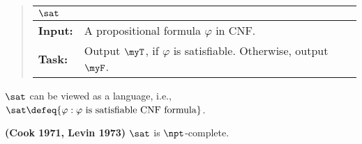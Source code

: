 \documentclass[11pt, a4paper]{article}
\begin{document}
\begin{quote}
{\def\arraystretch{1.25}
\begin{tabular}{|ll|}
\hline
\multicolumn{2}{|l|}{$\sat$}
\\
\hline
\hline
{\bf Input:}
&
A propositional formula $\varphi$ in CNF.
\\
{\bf Task:}
&
Output $\myT$, if 
$\varphi$ is satisfiable.
Otherwise, output $\myF$.
\\
\hline
\end{tabular}}
\end{quote}
$\sat$ can be viewed as a language, i.e.,
$\sat \defeq \{\varphi : \varphi \ \text{is satisfiable CNF formula}\}$.


\begin{theorem}
\label{theo:sat-np-complete}
{\bf (Cook 1971, Levin 1973)}
$\sat$ is $\npt$-complete.
\end{theorem}
\end{document}
